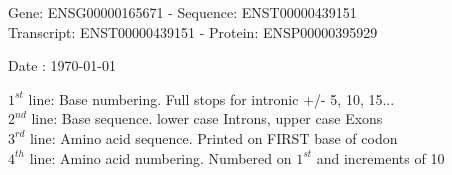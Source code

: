 \documentclass{article}
\begin{document}
\begin{center}
\begin{large}
Gene: ENSG00000165671 - Sequence: ENST00000439151\\
Transcript: ENST00000439151 - Protein: ENSP00000395929
 
 Date : \today
\end{large}
\end{center}
$1^{st}$ line: Base numbering. Full stops for intronic +/- 5, 10, 15...\\
$2^{nd}$ line: Base sequence. lower case Introns, upper case Exons\\
$3^{rd}$ line: Amino acid sequence. Printed on FIRST base of codon\\
$4^{th}$ line: Amino acid numbering. Numbered on $1^{st}$ and increments of 10\\
\end{document}
